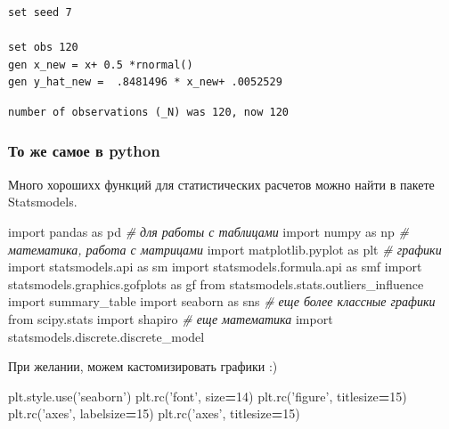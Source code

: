 \documentclass[]{book}
\newenvironment{Shaded}{\begin{snugshade}}{\end{snugshade}}
\newcommand{\CommentTok}[1]{\textcolor[rgb]{0.56,0.35,0.01}{\textit{#1}}}
\newcommand{\DecValTok}[1]{\textcolor[rgb]{0.00,0.00,0.81}{#1}}
\newcommand{\ImportTok}[1]{#1}
\newcommand{\NormalTok}[1]{#1}
\newcommand{\OperatorTok}[1]{\textcolor[rgb]{0.81,0.36,0.00}{\textbf{#1}}}
\newcommand{\StringTok}[1]{\textcolor[rgb]{0.31,0.60,0.02}{#1}}
\begin{document}
\begin{verbatim}
\end{verbatim}

\begin{verbatim}
set seed 7

set obs 120
gen x_new = x+ 0.5 *rnormal()
gen y_hat_new =  .8481496 * x_new+ .0052529
\end{verbatim}

\begin{verbatim}
number of observations (_N) was 120, now 120
\end{verbatim}

\hypertarget{----python}{%
\subsubsection{То же самое в python}\label{----python}}

Много хорошихх функций для статистических расчетов можно найти в пакете Statsmodels.

\begin{Shaded}
\begin{Highlighting}[]

\ImportTok{import}\NormalTok{ pandas }\ImportTok{as}\NormalTok{ pd }\CommentTok{# для работы с таблицами}
\ImportTok{import}\NormalTok{ numpy }\ImportTok{as}\NormalTok{ np }\CommentTok{# математика, работа с матрицами}
\ImportTok{import}\NormalTok{ matplotlib.pyplot }\ImportTok{as}\NormalTok{ plt }\CommentTok{# графики}
\ImportTok{import}\NormalTok{ statsmodels.api }\ImportTok{as}\NormalTok{ sm}
\ImportTok{import}\NormalTok{ statsmodels.formula.api }\ImportTok{as}\NormalTok{ smf}
\ImportTok{import}\NormalTok{ statsmodels.graphics.gofplots }\ImportTok{as}\NormalTok{ gf}
\ImportTok{from}\NormalTok{ statsmodels.stats.outliers_influence }\ImportTok{import}\NormalTok{ summary_table}
\ImportTok{import}\NormalTok{ seaborn }\ImportTok{as}\NormalTok{ sns }\CommentTok{# еще более классные графики}
\ImportTok{from}\NormalTok{ scipy.stats }\ImportTok{import}\NormalTok{ shapiro }\CommentTok{# еще математика}
\ImportTok{import}\NormalTok{ statsmodels.discrete.discrete_model}
\end{Highlighting}
\end{Shaded}

При желании, можем кастомизировать графики :)

\begin{Shaded}
\begin{Highlighting}[]
\NormalTok{plt.style.use(}\StringTok{'seaborn'}\NormalTok{)}
\NormalTok{plt.rc(}\StringTok{'font'}\NormalTok{, size}\OperatorTok{=}\DecValTok{14}\NormalTok{)}
\NormalTok{plt.rc(}\StringTok{'figure'}\NormalTok{, titlesize}\OperatorTok{=}\DecValTok{15}\NormalTok{)}
\NormalTok{plt.rc(}\StringTok{'axes'}\NormalTok{, labelsize}\OperatorTok{=}\DecValTok{15}\NormalTok{)}
\NormalTok{plt.rc(}\StringTok{'axes'}\NormalTok{, titlesize}\OperatorTok{=}\DecValTok{15}\NormalTok{)}
\end{Highlighting}
\end{Shaded}
\end{document}
